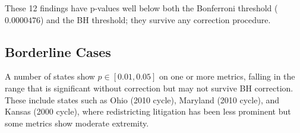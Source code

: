 These 12 findings have p-values well below both the Bonferroni threshold
($0.0000476$) and the BH threshold; they survive any correction procedure.

\subsection{Borderline Cases}

A number of states show $p \in [0.01, 0.05]$ on one or more metrics,
falling in the range that is significant without correction but may not
survive BH correction.
These include states such as Ohio (2010 cycle), Maryland (2010 cycle),
and Kansas (2000 cycle), where redistricting litigation has been less
prominent but some metrics show moderate extremity.
